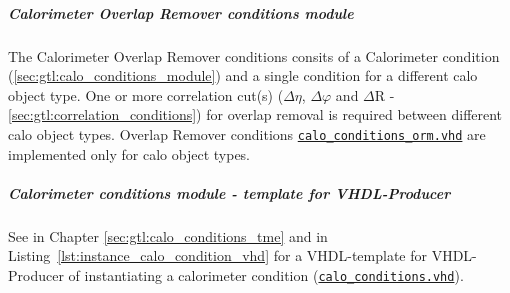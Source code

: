 \clearpage

\subparagraph{Calorimeter Overlap Remover conditions module}
\label{sec:gtl:calo_conditions_orm_module}
The Calorimeter Overlap Remover conditions consits of a Calorimeter condition (\ref{sec:gtl:calo_conditions_module}) and a single condition for a different calo object type. One or more correlation cut(s) ($\Delta\eta$, $\Delta\varphi$ and $\Delta$R - \ref{sec:gtl:correlation_conditions}) for overlap removal is required between different calo object types.
Overlap Remover conditions \href{https://github.com/cms-l1-globaltrigger/mp7_ugt_legacy/tree/master/firmware/hdl/gt_mp7_core/gtl_fdl_wrapper/gtl/calo_conditions_orm.vhd}{\texttt{calo\_conditions\_orm.vhd}} are implemented only for calo object types.

\subparagraph{Calorimeter conditions module - template for VHDL-Producer}
See in Chapter \ref{sec:gtl:calo_conditions_tme} and in Listing~\ref{lst:instance_calo_condition_vhd} for a VHDL-template for VHDL-Producer of instantiating a calorimeter condition (\href{https://github.com/cms-l1-globaltrigger/mp7_ugt_legacy/tree/master/firmware/hdl/gt_mp7_core/gtl_fdl_wrapper/gtl/calo_conditions.vhd}{\texttt{calo\_conditions.vhd}}).\\


